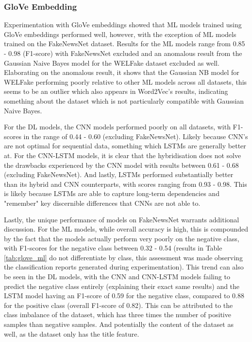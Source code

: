 \documentclass[stu,12pt,floatsintext,donotrepeattitle]{apa7}
\begin{document}
\subsubsection{GloVe Embedding}
Experimentation with GloVe embeddings showed that ML models trained using GloVe embeddings performed well, however, with the exception of ML models trained on the FakeNewsNet dataset. Results for the ML models range from 0.85 - 0.98 (F1-score) with FakeNewsNet excluded and an anomalous result from the Gaussian Naive Bayes model for the WELFake dataset excluded as well. Elaborating on the anomalous result, it shows that the Gaussian NB model for WELFake performing poorly relative to other ML models across all datasets, this seems to be an outlier which also appears in Word2Vec's results, indicating something about the dataset which is not particularly compatible with Gaussian Naive Bayes. 

For the DL models, the CNN models performed poorly on all datasets, with F1-scores in the range of 0.44 - 0.60 (excluding FakeNewsNet). Likely because CNN's are not optimal for sequential data, something which LSTMs are generally better at. For the CNN-LSTM models, it is clear that the hybridisation does not solve the drawbacks experienced by the CNN model with results between 0.61 - 0.68 (excluding FakeNewsNet). And lastly, LSTMs performed substantially better than its hybrid and CNN counterparts, with scores ranging from 0.93 - 0.98. This is likely because LSTMs are able to capture long-term dependencies and "remember" key discernible differences that CNNs are not able to.

Lastly, the unique performance of models on FakeNewsNet warrants additional discussion. For the ML models, while overall accuracy is high, this is compounded by the fact that the models actually perform very poorly on the negative class, with F1-scores for the negative class between 0.32 - 0.54 (results in Table \ref{tab:glove_ml} do not differentiate by class, this assessment was made observing the classification reports generated during experimentation). This trend can also be seen in the DL models, with the CNN and CNN-LSTM models failing to predict the negative class entirely (explaining their exact same results) and the LSTM model having an F1-score of 0.59 for the negative class, compared to 0.88 for the positive class (overall F1-score of 0.82). This can be attributed to the class imbalance of the dataset, which has three times the number of positive samples than negative samples. And potentially the content of the dataset as well, as the dataset only has the title feature. 
\end{document}
